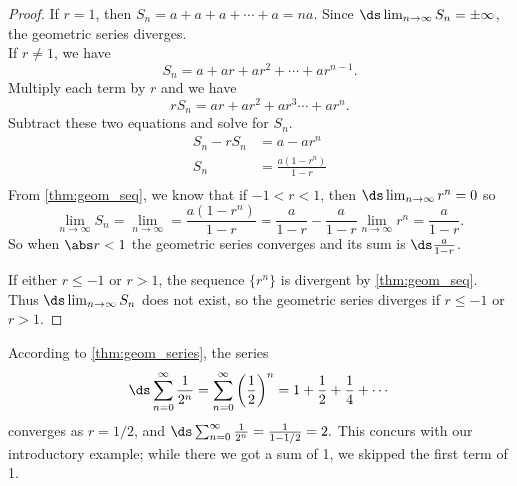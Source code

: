 \begin{proof}
If $r=1$, then $S_n=a+a+a+\dotsb+a=na$. Since $\ds\lim_{n\to \infty} S_n=\pm \infty$, the geometric series diverges.\\
If $r\neq 1$, we have
\[S_n=a+ar+ar^2+\dotsb+ar^{n-1}.\]
Multiply each term by $r$ and we have 
\[rS_n=ar+ar^2+ar^3\dotsb+ar^n.\]
Subtract these two equations and solve for $S_n$.
\begin{align*}
S_n-rS_n &=a-ar^n \\
S_n &=\frac{a(1-r^n)}{1-r}\\
\end{align*}
From \autoref{thm:geom_seq}, we know that if $-1<r<1$, then $\ds \lim_{n\to \infty} r^n=0$ so
\[
\lim_{n\to \infty} S_n=\lim_{n\to \infty}=\frac{a(1-r^n)}{1-r}
=\frac{a}{1-r}- \frac{a}{1-r}\lim_{n\to \infty}r^n=\frac{a}{1-r}.
\]
So when $\abs r<1$ the geometric series converges and its sum is $\ds \frac{a}{1-r}$.

If either $r\leq -1$ or $r>1$, the sequence $\{r^n\}$ is divergent by \autoref{thm:geom_seq}. Thus $\ds \lim_{n\to \infty} S_n$ does not exist, so the geometric series diverges if $r\leq -1$ or \mbox{$r>1$.} %
\end{proof}

According to \autoref{thm:geom_series}, the series 
\[
\ds\sum_{n=0}^\infty \frac{1}{2^n}
=\sum_{n=0}^\infty \left(\frac 12\right)^n= 1+\frac12+\frac14+\dotsb
\]
converges as $r=1/2$, and $\ds \sum_{n=0}^\infty \frac{1}{2^n} = \frac{1}{1-1/2} = 2.$ This concurs with our introductory example; while there we got a sum of 1, we skipped the first term of 1.

